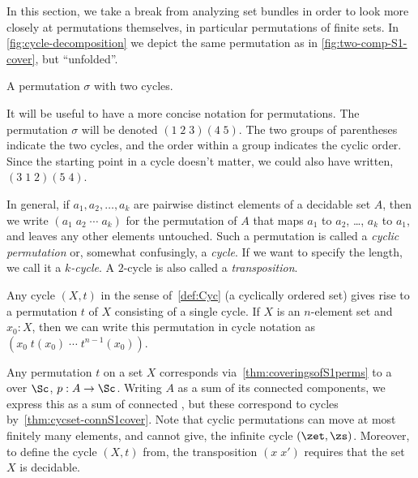 In this section, we take a break from analyzing set bundles in order to look more closely at permutations themselves, in particular permutations of finite sets.
In \cref{fig:cycle-decomposition} we depict the same permutation as in \cref{fig:two-comp-S1-cover}, but ``unfolded''.
\begin{marginfigure}
  \caption{A permutation $\sigma$ with two cycles.}
  \label{fig:cycle-decomposition}
\end{marginfigure}
It will be useful to have a more concise notation for permutations.
The permutation $\sigma$ will be denoted $(1\;2\;3)(4\;5)$.
The two groups of parentheses indicate the two cycles,
and the order within a group indicates the cyclic order.
Since the starting point in a cycle doesn't matter,
we could also have written, \eg $(3\;1\;2)(5\;4)$.

In general, if $a_1,a_2,\dots,a_k$ are pairwise distinct elements of a decidable set $A$,
then we write $(a_1\;a_2\;\cdots\;a_k)$ for the permutation of $A$
that maps $a_1$ to $a_2$, \ldots, $a_k$ to $a_1$, and leaves any other elements untouched.
Such a permutation is called a \emph{cyclic permutation} or, somewhat confusingly, a \emph{cycle}.
If we want to specify the length, we call it a \emph{$k$-cycle}.
A $2$-cycle is also called a \emph{transposition}.

\begin{remark}\label{rem:cycle-vs-cycle}
  Any cycle $(X,t)$ in the sense of~\cref{def:Cyc} (\ie a cyclically ordered set)
  gives rise to a permutation $t$ of $X$ consisting of a single cycle.
  If $X$ is an $n$-element set and $x_0:X$,
  then we can write this permutation in cycle notation
  as $(x_0\;t(x_0)\;\cdots\;t^{n-1}(x_0))$.

  Any permutation $t$ on a set $X$ corresponds via~\cref{thm:coveringsofS1perms}
  to a \covering over $\Sc$, $p : A \to \Sc$.
  Writing $A$ as a sum of its connected components,
  we express this \covering as a sum of connected \coverings,
  but these correspond to cycles by~\cref{thm:cycset-connS1cover}.
  Note that cyclic permutations can move at most finitely many elements,
  and cannot give, \eg the infinite cycle $(\zet,\zs)$. 
  Moreover, to define the cycle $(X,t)$ from, 
  \eg the transposition $(x\;x')$ requires that the set $X$ is decidable.
\end{remark}

